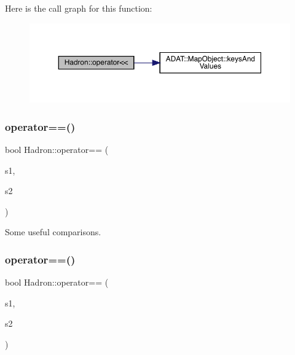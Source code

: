 Here is the call graph for this function\+:\nopagebreak
\begin{figure}[H]
\begin{center}
\leavevmode
\includegraphics[width=350pt]{d1/daf/namespaceHadron_aa68c7efacb8bc21a4d87aede8544def5_cgraph}
\end{center}
\end{figure}
\mbox{\label{namespaceHadron_a6a6810ed7f262fbb4167534023c0b191}} 
\subsubsection{\texorpdfstring{operator==()}{operator==()}\hspace{0.1cm}{\footnotesize\ttfamily [1/5]}}
{\footnotesize\ttfamily bool Hadron\+::operator== (\begin{DoxyParamCaption}\item[{const \mbox{\hyperlink{structHadron_1_1QuarkNum__t}{Quark\+Num\+\_\+t}} \&}]{s1,  }\item[{const \mbox{\hyperlink{structHadron_1_1QuarkNum__t}{Quark\+Num\+\_\+t}} \&}]{s2 }\end{DoxyParamCaption})}



Some useful comparisons. 

\mbox{\label{namespaceHadron_a89bb389d765cff67405fdb2d27b9b289}} 
\subsubsection{\texorpdfstring{operator==()}{operator==()}\hspace{0.1cm}{\footnotesize\ttfamily [2/5]}}
{\footnotesize\ttfamily bool Hadron\+::operator== (\begin{DoxyParamCaption}\item[{const \mbox{\hyperlink{structHadron_1_1HadronAdjMapTarget__t}{Hadron\+Adj\+Map\+Target\+\_\+t}} \&}]{s1,  }\item[{const \mbox{\hyperlink{structHadron_1_1HadronAdjMapTarget__t}{Hadron\+Adj\+Map\+Target\+\_\+t}} \&}]{s2 }\end{DoxyParamCaption})}



